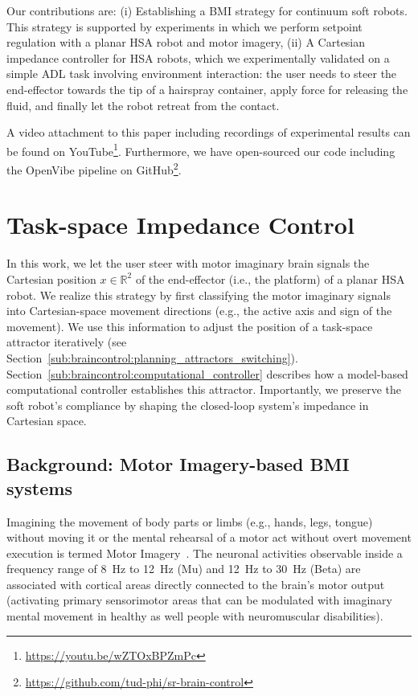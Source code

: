 \documentclass[letterpaper, 10pt, conference]{ieeeconf}      %
\begin{document}
Our contributions are: (i) Establishing a \gls{BMI} strategy for continuum soft robots. This strategy is supported by experiments in which we perform setpoint regulation with a planar \gls{HSA} robot and motor imagery, (ii) A Cartesian impedance controller for \gls{HSA} robots, which we experimentally validated on a simple \gls{ADL} task involving environment interaction: the user needs to steer the end-effector towards the tip of a hairspray container, apply force for releasing the fluid, and finally let the robot retreat from the contact.          

A video attachment to this paper including recordings of experimental results can be found on YouTube\footnote{\url{https://youtu.be/wZTOxBPZmPc}}.
Furthermore, we have open-sourced our code including the OpenVibe pipeline on GitHub\footnote{\url{https://github.com/tud-phi/sr-brain-control}}.

\section{Task-space Impedance Control}
In this work, we let the user steer with motor imaginary brain signals the Cartesian position $x \in \mathbb{R}^2$ of the end-effector (i.e., the platform) of a planar \gls{HSA} robot.
We realize this strategy by first classifying the motor imaginary signals into Cartesian-space movement directions (e.g., the active axis and sign of the movement). We use this information to adjust the position of a task-space attractor iteratively (see Section~\ref{sub:braincontrol:planning_attractors_switching}). Section~\ref{sub:braincontrol:computational_controller} describes how a model-based computational controller establishes this attractor. Importantly, we preserve the soft robot's compliance by shaping the closed-loop system's impedance in Cartesian space.


\subsection{Background: Motor Imagery-based BMI systems}\label{sub:braincontrol:motor_imagery_bmi}

Imagining the movement of body parts or limbs (e.g., hands, legs, tongue) without moving it or the mental rehearsal of a motor act without overt movement execution is termed Motor Imagery~\cite{lotze2006motor}.  The neuronal activities observable inside a frequency range of \SI{8}{Hz} to \SI{12}{Hz} (Mu) and \SI{12}{Hz} to \SI{30}{Hz} (Beta) are associated with cortical areas directly connected to the brain’s motor output (activating primary sensorimotor areas that can be modulated with imaginary mental movement in healthy as well people with neuromuscular disabilities). 
\end{document}
